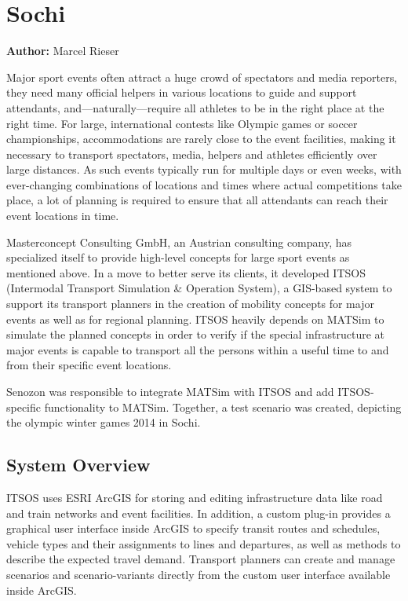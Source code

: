 \section{Sochi}
\label{sec:sochi}
\hfill \textbf{Author:} Marcel Rieser

Major sport events often attract a huge crowd of spectators and media
reporters, they need many official helpers in various locations to guide and
support attendants, and---naturally---require all athletes to be in
the right place at the right time. For large, international contests like
Olympic games or soccer championships, accommodations are rarely close to the
event facilities, making it necessary to transport spectators, media, helpers
and athletes efficiently over large distances. As such events typically run for
multiple days or even weeks, with ever-changing combinations of locations and
times where actual competitions take place, a lot of planning is required to
ensure that all attendants can reach their event locations in time.

Masterconcept Consulting GmbH, an Austrian consulting company, has specialized
itself to provide high-level concepts for large sport events as mentioned above.  In a
move to better serve its clients, it developed ITSOS (Intermodal Transport
Simulation \& Operation System), a GIS-based system to support its transport
planners in the creation of mobility concepts for major events as well as for
regional planning.  ITSOS heavily depends on MATSim to simulate the planned
concepts in order to verify if the special infrastructure at major events is
capable to transport all the persons within a useful time to and from
their specific event locations.

Senozon was responsible to integrate MATSim with ITSOS and add ITSOS-specific
functionality to MATSim. Together, a test scenario was created, depicting the
olympic winter games 2014 in Sochi.

\subsection{System Overview}
ITSOS uses ESRI ArcGIS for storing and editing infrastructure data like road
and train networks and event facilities. In addition, a custom plug-in provides a
graphical user interface inside ArcGIS to specify transit routes and schedules,
vehicle types and their assignments to lines and departures, as well as methods
to describe the expected travel demand. Transport planners can create and manage
scenarios and scenario-variants directly from the custom user interface
available inside ArcGIS.

